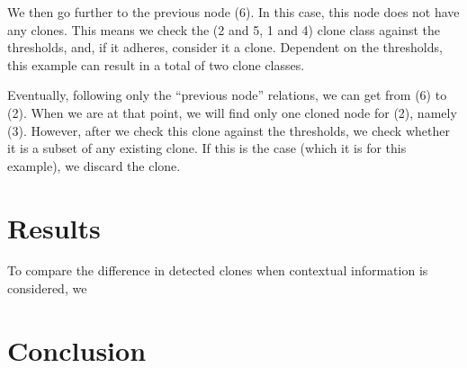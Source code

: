 \documentclass[conference]{IEEEtran}
\begin{document}
We then go further to the previous node (6). In this case, this node does not have any clones. This means we check the (2 and 5, 1 and 4) clone class against the thresholds, and, if it adheres, consider it a clone. Dependent on the thresholds, this example can result in a total of two clone classes.

Eventually, following only the ``previous node'' relations, we can get from (6) to (2). When we are at that point, we will find only one cloned node for (2), namely (3). However, after we check this clone against the thresholds, we check whether it is a subset of any existing clone. If this is the case (which it is for this example), we discard the clone.

\section{Results}
To compare the difference in detected clones when contextual information is considered, we 

\section{Conclusion}



\end{document}
